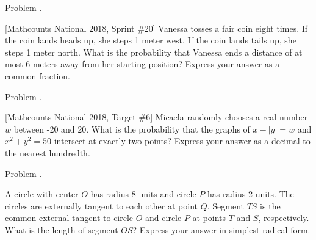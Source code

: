 \documentclass[9pt]{beamer}
\newcounter{problem}[section]
\begin{document}
\begin{frame}[t, fragile]{Problem \thesection.\theproblem}
    \begin{block}{}[Mathcounts National 2018, Sprint \#20]
    Vanessa tosses a fair coin eight times. If the coin lands heads up, she steps 1 meter west. If the coin lands tails up, she steps 1 meter north. What is the probability that Vanessa ends a distance of at most 6 meters away from her starting position? Express your answer as a common fraction.
    
    \end{block}
\end{frame}




\begin{frame}[t, fragile]{Problem \thesection.\theproblem}
    \begin{block}{}[Mathcounts National 2018, Target \#6]
    Micaela randomly chooses a real number $ w $ between -20 and 20. What is the probability that the graphs of $ x -|y| = w $ and $ x^2 + y^2 = 50 $ intersect at exactly two points? Express your answer as a decimal to the nearest hundredth.
    
    \end{block}
\end{frame}




\begin{frame}[t, fragile]{Problem \thesection.\theproblem}
    \begin{block}{}
    A circle with center $O$ has radius 8 units and circle $P$ has radius 2 units. The circles are externally tangent to each other at point $Q$. Segment $TS$ is the common external tangent to circle $O$ and circle $P$ at points $T$ and $S$, respectively. What is the length of segment $OS$? Express your answer in simplest radical form.
	
    \end{block}
\end{frame}
\end{document}
